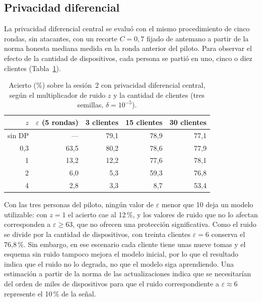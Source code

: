 \subsection{Privacidad diferencial}
\label{sec:res-privacidad}

La privacidad diferencial central se evaluó con el mismo procedimiento de cinco rondas, sin atacantes, con un recorte $C = 0{,}7$ fijado de antemano a partir de la norma honesta mediana medida en la ronda anterior del piloto. Para observar el efecto de la cantidad de dispositivos, cada persona se partió en uno, cinco o diez clientes (Tabla~\ref{tab:privacidad}).

\begin{table}[h]
    \centering
    \begin{tabular}{rrrrr}
        \toprule
        $z$ & $\varepsilon$ (5 rondas) & 3 clientes & 15 clientes & 30 clientes \\
        \midrule
        sin DP & --- & 79,1 & 78,9 & 77,1 \\
        0,3 & 63,5 & 80,2 & 78,6 & 77,9 \\
        1 & 13,2 & 12,2 & 77,6 & 78,1 \\
        2 & 6,0 & 5,3 & 59,3 & 76,8 \\
        4 & 2,8 & 3,3 & 8,7 & 53,4 \\
        \bottomrule
    \end{tabular}
    \caption{Acierto (\%) sobre la sesión~2 con privacidad diferencial central, según el multiplicador de ruido $z$ y la cantidad de clientes (tres semillas, $\delta = 10^{-5}$).}
    \label{tab:privacidad}
\end{table}

Con las tres personas del piloto, ningún valor de $\varepsilon$ menor que 10 deja un modelo utilizable: con $z = 1$ el acierto cae al 12\,\%, y los valores de ruido que no lo afectan corresponden a $\varepsilon \geq 63$, que no ofrecen una protección significativa. Como el ruido se divide por la cantidad de dispositivos, con treinta clientes $\varepsilon = 6$ conserva el 76,8\,\%. Sin embargo, en ese escenario cada cliente tiene unas nueve tomas y el esquema sin ruido tampoco mejora el modelo inicial, por lo que el resultado indica que el ruido no lo degrada, no que el modelo siga aprendiendo. Una estimación a partir de la norma de las actualizaciones indica que se necesitarían del orden de miles de dispositivos para que el ruido correspondiente a $\varepsilon \approx 6$ represente el 10\,\% de la señal.

